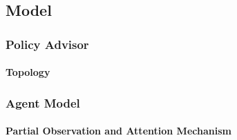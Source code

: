 \documentclass{article}
\begin{document}
	\subsection{Model}

	\subsubsection{Policy Advisor}

	\paragraph{Topology}



	\subsubsection{Agent Model}

	\paragraph{Partial Observation and Attention Mechanism}

\end{document}
